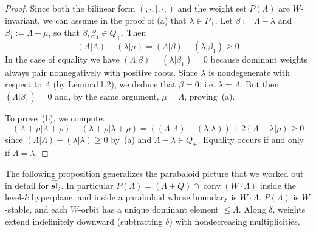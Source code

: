 \documentclass[12pt]{article}
\begin{document}
\begin{proof}
    Since both the bilinear form $(,\cdot,|,\cdot,)$ and the weight set $P(\Lambda)$ are $W$-invariant, we can assume in the proof of (a) that $\lambda \in P_+$. Let $\beta := \Lambda - \lambda$ and $\beta_1 := \Lambda - \mu$, so that $\beta, \beta_1 \in Q_+$. Then
    \[(\Lambda|\Lambda) - (\lambda|\mu) = (\Lambda|\beta) + (\lambda|\beta_1) \ge 0\]
    In the case of equality we have $(\Lambda|\beta) = (\lambda|\beta_1) = 0$ because dominant weights always pair nonnegatively with positive roots.
    Since $\lambda$ is nondegenerate with respect to $\Lambda$ (by Lemma11.2), we deduce that $\beta = 0$, i.e. $\lambda = \Lambda$. But then $(\Lambda|\beta_1) = 0$ and, by the same argument, $\mu = \Lambda$, proving~(a).

    To prove~(b), we compute:
    \[(\Lambda + \rho|\Lambda + \rho) - (\lambda + \rho|\lambda + \rho)
        = ((\Lambda|\Lambda) - (\lambda|\lambda)) + 2(\Lambda - \lambda|\rho) \ge 0
    \]
    since $(\Lambda|\Lambda) - (\lambda|\lambda) \ge 0$ by~(a) and $\Lambda - \lambda \in Q_+$. Equality occurs if and only if $\Lambda = \lambda$.
\end{proof}

The following proposition generalizes the parabaloid picture that we worked out in detail for $\widehat{\mathfrak{sl}}_2$. In particular $P(\Lambda)=(\Lambda+Q)\cap\operatorname{conv}(W\cdot\Lambda)$ inside the level-$k$ hyperplane, and inside a paraboloid whose boundary is $W\cdot\Lambda$. $P(\Lambda)$ is $W$-stable, and each $W$-orbit has a unique dominant element $\leq \Lambda$. Along $\delta$, weights extend indefinitely downward (subtracting $\delta$) with nondecreasing multiplicities.
\end{document}
